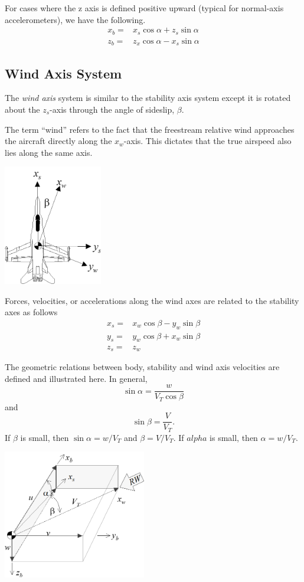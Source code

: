 \documentclass[
]{book}
\begin{document}
For cases where the z axis is defined positive upward (typical for normal-axis accelerometers), we have the following.
\begin{align}
x_b =& x_s \cos \alpha + z_s \sin \alpha \\
z_b =& z_x \cos \alpha - x_s \sin \alpha
\end{align}

\hypertarget{wind-axis-system}{%
\subsection{Wind Axis System}\label{wind-axis-system}}

The \emph{wind axis} system is similar to the stability axis system except it is rotated about the \(z_s\)-axis through the angle of sideslip, \(\beta\).

The term ``wind'' refers to the fact that the freestream relative wind approaches the aircraft directly along the \(x_w\)-axis. This dictates that the true airspeed also lies along the same axis.

\includegraphics[width=1.69931in,height=2.07014in]{media/06/image5.png}

Forces, velocities, or accelerations along the wind axes are related to the stability axes as follows
\begin{align}
x_s =&x_w \cos \beta - y_w \sin \beta \\
y_s =& y_w \cos \beta + x_w \sin \beta \\
z_s =& z_w
\end{align}

The geometric relations between body, stability and wind axis velocities are defined and illustrated here. In general,
\[ \sin \alpha = \frac{w}{V_T \cos \beta}\] and
\[\sin \beta = \frac{V}{V_T}.\]
If \(\beta\) is small, then \(\sin \alpha = w/V_T\) and \(\beta = V / V_T\). If \(alpha\) is small, then \(\alpha = w/V_T\).

\includegraphics[width=2.45903in,height=2.21875in]{media/06/image6.png}
\end{document}
